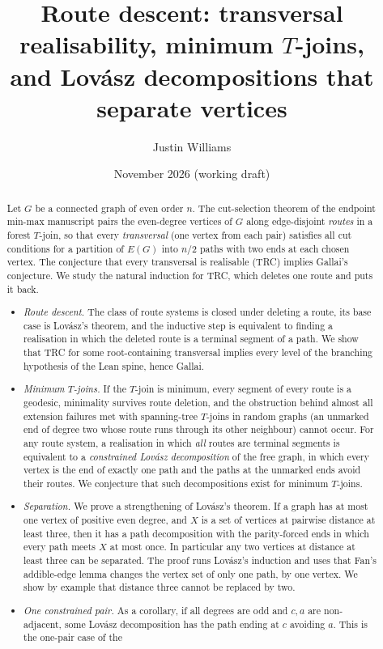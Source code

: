 \documentclass[11pt]{amsart}
\title[Route descent]{Route descent: transversal realisability, minimum $T$-joins,\\ and Lov\'asz
decompositions that separate vertices}
\author{Justin Williams}
\date{November 2026 (working draft)}
\theoremstyle{definition}
\begin{document}
\begin{abstract}
Let $G$ be a connected graph of even order $n$. The cut-selection theorem of the endpoint min-max
manuscript pairs the even-degree vertices of $G$ along edge-disjoint \emph{routes} in a forest $T$-join, so
that every \emph{transversal} (one vertex from each pair) satisfies all cut conditions for a partition of
$E(G)$ into $n/2$ paths with two ends at each chosen vertex. The conjecture that every transversal is
realisable (TRC) implies Gallai's conjecture. We study the natural induction for TRC, which deletes
one route and puts it back.
\begin{itemize}
\item \emph{Route descent.} The class of route systems is closed under deleting a route, its base case is
Lov\'asz's theorem, and the inductive step is equivalent to finding a realisation in which the deleted
route is a terminal segment of a path. We show that TRC for some root-containing transversal implies
every level of the branching hypothesis of the Lean spine, hence Gallai.
\item \emph{Minimum $T$-joins.} If the $T$-join is minimum, every segment of every route is a geodesic,
minimality survives route deletion, and the obstruction behind almost all extension failures met
with spanning-tree $T$-joins in random graphs (an unmarked end of degree two whose route runs through
its other neighbour) cannot occur. For any
route system, a realisation in which \emph{all} routes are terminal segments is equivalent to a
\emph{constrained Lov\'asz decomposition} of the free graph, in which every vertex is the end of exactly
one path and the paths at the unmarked ends avoid their routes. We conjecture that such decompositions
exist for minimum $T$-joins.
\item \emph{Separation.} We prove a strengthening of Lov\'asz's theorem. If a graph has at most one vertex
of positive even degree, and $X$ is a set of vertices at pairwise distance at least three, then it has a
path decomposition with the parity-forced ends in which every path meets $X$ at most once. In
particular any two vertices at distance at least three can be separated. The proof runs
Lov\'asz's induction and uses that Fan's addible-edge lemma changes the vertex set of only one path, by
one vertex. We show by example that distance three cannot be replaced by two.
\item \emph{One constrained pair.} As a corollary, if all degrees are odd and $c,a$ are non-adjacent,
some Lov\'asz decomposition has the path ending at $c$ avoiding $a$. This is the one-pair case of the

\end{itemize}
\end{abstract}
\end{document}
